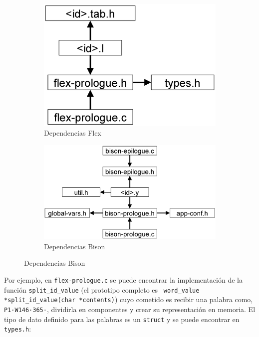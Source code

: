\begin{figure}
    \centering
    \begin{subfigure}[b]{0.40\textwidth}
        \centering
        \includegraphics[width=\textwidth]{imaxes/h-implementacion/relaciones-flex}
        \caption{Dependencias Flex}
        \label{fig:dependencia-flex}
    \end{subfigure}
    \hfill
    \begin{subfigure}[b]{0.59\textwidth}
        \centering
        \includegraphics[width=\textwidth]{imaxes/h-implementacion/relaciones-bison}
        \caption{Dependencias Bison}
        \label{fig:dependencia-bison}
    \end{subfigure}
\end{figure}

Por ejemplo, en \verb|flex-prologue.c| se puede encontrar la implementación de la función \verb|split_id_value| (el prototipo completo es \verb| word_value *split_id_value(char *contents)|) cuyo cometido es recibir una palabra como, \verb|P1·W146·365·|, dividirla en componentes y crear su representación en memoria. El tipo de dato definido para las palabras es un \verb|struct| y se puede encontrar en \verb|types.h|:

